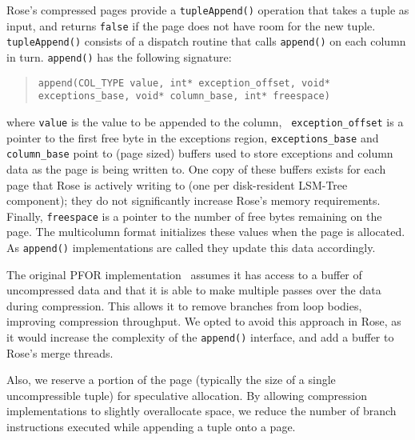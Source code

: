 \documentclass{vldb}
\newcommand{\rows}{Rose\xspace}
\newcommand{\rowss}{Rose's\xspace}
\begin{document}
\rowss compressed pages provide a {\tt tupleAppend()} operation that
takes a tuple as input, and returns {\tt false} if the page does not have
room for the new tuple.  {\tt tupleAppend()} consists of a dispatch
routine that calls {\tt append()} on each column in turn.
{\tt append()} has the
following signature:
\begin{quote}
  {\tt append(COL\_TYPE value, int* exception\_offset,
       void* exceptions\_base, void* column\_base, int* freespace) }
\end{quote}
where {\tt value} is the value to be appended to the column, {\tt
  exception\_offset} is a pointer to the first free byte in the
exceptions region, {\tt exceptions\_base} and {\tt column\_base} point
to (page sized) buffers used to store exceptions and column data as
the page is being written to.  One copy of these buffers exists for
each page that \rows is actively writing to (one per disk-resident
LSM-Tree component); they do not significantly increase \rowss memory
requirements.  Finally, {\tt freespace} is a pointer to the number of
free bytes remaining on the page.  The multicolumn format initializes
these values when the page is allocated.  As {\tt append()}
implementations are called they update this data accordingly.



The original PFOR implementation~\cite{pfor} assumes it has access to
a buffer of uncompressed data and that it is able to make multiple
passes over the data during compression.  This allows it to remove
branches from loop bodies, improving compression throughput.  We opted
to avoid this approach in \rows, as it would increase the complexity
of the {\tt append()} interface, and add a buffer to \rowss merge threads.

Also, we reserve a portion of the page (typically the size of a
single uncompressible tuple) for speculative allocation.  By allowing
compression implementations to slightly overallocate space, we reduce
the number of branch instructions executed while appending a tuple
onto a page.
\end{document}
